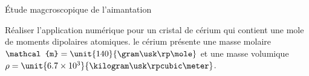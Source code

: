\begin{td}{Étude magcroscopique de l'aimantation}
\begin{exlist}
	  \item Réaliser l'application numérique pour un cristal de cérium qui contient
	    une mole de moments dipolaires atomiques. le cérium présente une masse molaire
	    $\mathcal{m} = \unit{140}{\gram \usk \rp \mole}$ et une masse volumique
    $\rho = \unit{6.7 \times 10^3}{\kilogram \usk \rpcubic \meter}$.
	\end{exlist}
\end{td}
